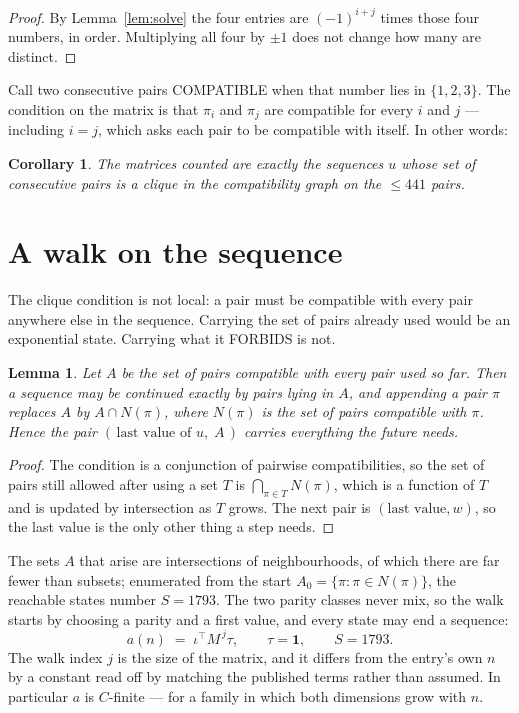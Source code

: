 \documentclass[11pt,a4paper]{article}
\theoremstyle{plain}
\newtheorem{lemma}[theorem]{Lemma}
\newtheorem{corollary}[theorem]{Corollary}
\theoremstyle{definition}
\begin{document}
\begin{proof}
By Lemma~\ref{lem:solve} the four entries are $(-1)^{i+j}$ times those four numbers, in
order. Multiplying all four by $\pm1$ does not change how many are distinct.
\end{proof}

Call two consecutive pairs COMPATIBLE when that number lies in $\{1,2,3\}$. The condition on the
matrix is that $\pi_i$ and $\pi_j$ are compatible for every $i$ and $j$ --- including $i=j$,
which asks each pair to be compatible with itself. In other words:

\begin{corollary}
The matrices counted are exactly the sequences $u$ whose set of consecutive pairs is a clique in
the compatibility graph on the $\le 441$ pairs.
\end{corollary}

\section{A walk on the sequence}

The clique condition is not local: a pair must be compatible with every pair anywhere else in
the sequence. Carrying the set of pairs already used would be an exponential state. Carrying
what it FORBIDS is not.

\begin{lemma}\label{lem:lump}
Let $A$ be the set of pairs compatible with every pair used so far. Then a sequence may be
continued exactly by pairs lying in $A$, and appending a pair $\pi$ replaces $A$ by
$A\cap N(\pi)$, where $N(\pi)$ is the set of pairs compatible with $\pi$. Hence the pair
$(\,\text{last value of }u,\;A\,)$ carries everything the future needs.
\end{lemma}

\begin{proof}
The condition is a conjunction of pairwise compatibilities, so the set of pairs still allowed
after using a set $T$ is $\bigcap_{\pi\in T}N(\pi)$, which is a function of $T$ and is updated
by intersection as $T$ grows. The next pair is $(\text{last value},w)$, so the last value is
the only other thing a step needs.
\end{proof}

The sets $A$ that arise are intersections of neighbourhoods, of which there are far fewer than
subsets; enumerated from the start $A_0=\{\pi:\pi\in N(\pi)\}$, the reachable states number
$S=1793$. The two parity classes never mix, so the walk starts by choosing a parity and a first
value, and every state may end a sequence:
\[
a(n)\;=\;\iota^{\!\top}M^{\,j}\tau ,\qquad \tau=\mathbf{1},\qquad S=1793.
\]
The walk index $j$ is the size of the matrix, and it differs from the entry's own $n$ by a
constant read off by matching the published terms rather than assumed. In particular $a$ is
$C$-finite --- for a family in which both dimensions grow with $n$.
\end{document}
